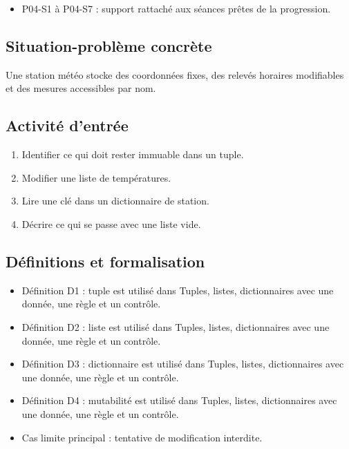 \begin{itemize}
\tightlist
\item
  P04-S1 à P04-S7 : support rattaché aux séances prêtes de la
  progression.
\end{itemize}

\subsection{Situation-problème concrète}

Une station météo stocke des coordonnées fixes, des relevés horaires
modifiables et des mesures accessibles par nom.

\subsection{Activité d’entrée}

\begin{enumerate}
\def\labelenumi{\arabic{enumi}.}
\tightlist
\item
  Identifier ce qui doit rester immuable dans un tuple.
\item
  Modifier une liste de températures.
\item
  Lire une clé dans un dictionnaire de station.
\item
  Décrire ce qui se passe avec une liste vide.
\end{enumerate}

\subsection{Définitions et formalisation}

\begin{itemize}
\tightlist
\item
  Définition D1 : tuple est utilisé dans Tuples, listes, dictionnaires
  avec une donnée, une règle et un contrôle.
\item
  Définition D2 : liste est utilisé dans Tuples, listes, dictionnaires
  avec une donnée, une règle et un contrôle.
\item
  Définition D3 : dictionnaire est utilisé dans Tuples, listes,
  dictionnaires avec une donnée, une règle et un contrôle.
\item
  Définition D4 : mutabilité est utilisé dans Tuples, listes,
  dictionnaires avec une donnée, une règle et un contrôle.
\item
  Cas limite principal : tentative de modification interdite.
\end{itemize}

